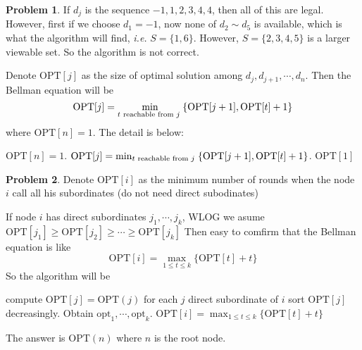 \documentclass[a4paper]{article}
\theoremstyle{definition}
\newtheorem{problem}{Problem}
\theoremstyle{plain}
\newcommand{\dps}{\displaystyle}
\newcommand{\OPT}{\mathrm{OPT}}
\numberwithin{equation}{problem}
\newcommand{\ie}{ \textit{ i.e. } }
\begin{document}
\begin{problem}
    If  $ d_j $ is the sequence  $ -1,1,2,3,4,4 $, then all of this are legal. However, first if  we choose   $ d_1=-1 $, now none of  $ d_2\sim d_5 $ is available, which is what the algorithm will find, \ie   $ S=\{1,6\} $. However,  $ S=\{2,3,4,5\} $ is a larger viewable set. So the algorithm is not correct.
    
    Denote  $ \OPT[j] $ as the size of optimal solution among  $ d_j,d_{j+1},\cdots,d_n $. Then the Bellman equation will be 
    \[\OPT[j]=\min_{t \text{ reachable from  $ j $ }}\{\OPT[j+1],\OPT[t]+1\}\]  
    where  $ \OPT[n]=1 $. The detail is below:
    \begin{algorithm}
        \begin{algorithmic}[1]
            \STATE  $ \OPT[n]=1 $.
                \STATE  $ \OPT[j]=\min_{t \text{ reachable from  $ j $ }}\{\OPT[j+1],\OPT[t]+1\} $. 
            \ENDFOR
            \RETURN  $ \OPT[1] $ 
        \end{algorithmic}
    \end{algorithm} 
\end{problem}
\begin{problem}
    Denote  $ \OPT[i] $ as the minimum number of rounds when the node  $ i $ call all his subordinates (do not need direct subodinates)
    
    If node  $ i  $ has direct subordinates  $ j_1,\cdots,j_k $, WLOG we asume  $ \OPT[j_1] \geq \OPT[j_2] \geq \cdots \geq \OPT[j_k] $  
    Then easy to comfirm that the Bellman equation is like 
    \[\OPT[i]=\max_{1 \leq t \leq k}\{\OPT[t]+t\}\]
    So the algorithm will be 
    \begin{algorithm}
        \caption{ $ \OPT(i) $ }
        \begin{algorithmic}[1]
            \STATE compute $ \OPT[j]=\OPT(j) $ for each  $ j $ direct subordinate of  $ i $
            \STATE sort  $ \OPT[j] $ decreasingly. Obtain  $ \mathrm{opt}_1,\cdots,\mathrm{opt}_k $.
            \STATE  $\dps \OPT[i]=\max_{1 \leq t \leq k}\{\OPT[t]+t\} $ 
        \end{algorithmic}
    \end{algorithm} 
    The answer is  $ \OPT(n) $ where  $ n $ is the root node.  
\end{problem}
\end{document}
